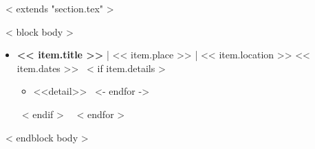 ~< extends "section.tex" >~

~< block body >~
  \begin{itemize}
    ~< for item in items >~
      \item \textbf{<< item.title >>} | << item.place >> | << item.location >> \hfill << item.dates >>
        ~< if item.details >~
            \begin{itemize}
            ~< for detail in item.details ->~
                \item <<detail>>
            ~<- endfor ->~
            \end{itemize}
        ~< endif >~
    ~< endfor >~
  \end{itemize}
~< endblock body >~
